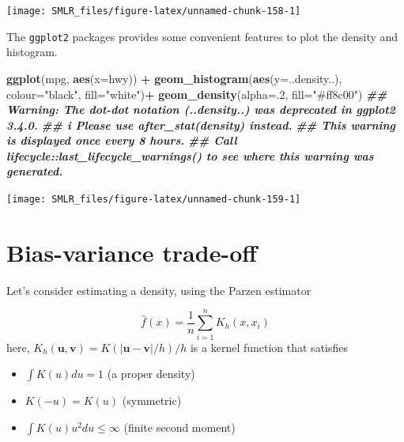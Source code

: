 \documentclass[
]{book}
\newenvironment{Shaded}{\begin{snugshade}}{\end{snugshade}}
\newcommand{\AttributeTok}[1]{\textcolor[rgb]{0.13,0.29,0.53}{#1}}
\newcommand{\DecValTok}[1]{\textcolor[rgb]{0.00,0.00,0.81}{#1}}
\newcommand{\DocumentationTok}[1]{\textcolor[rgb]{0.56,0.35,0.01}{\textbf{\textit{#1}}}}
\newcommand{\FunctionTok}[1]{\textcolor[rgb]{0.13,0.29,0.53}{\textbf{#1}}}
\newcommand{\NormalTok}[1]{#1}
\newcommand{\SpecialCharTok}[1]{\textcolor[rgb]{0.81,0.36,0.00}{\textbf{#1}}}
\newcommand{\StringTok}[1]{\textcolor[rgb]{0.31,0.60,0.02}{#1}}
\providecommand{\tightlist}{%
  \setlength{\itemsep}{0pt}\setlength{\parskip}{0pt}}
\theoremstyle{definition}
\theoremstyle{definition}
\theoremstyle{definition}
\theoremstyle{definition}
\theoremstyle{remark}
\begin{document}
\begin{center}\texttt{[image: SMLR\_files/figure-latex/unnamed-chunk-158-1]} \end{center}

The \texttt{ggplot2} packages provides some convenient features to plot the density and histogram.

\begin{Shaded}
\begin{Highlighting}[]
  \FunctionTok{ggplot}\NormalTok{(mpg, }\FunctionTok{aes}\NormalTok{(}\AttributeTok{x=}\NormalTok{hwy)) }\SpecialCharTok{+} 
    \FunctionTok{geom\_histogram}\NormalTok{(}\FunctionTok{aes}\NormalTok{(}\AttributeTok{y=}\NormalTok{..density..), }\AttributeTok{colour=}\StringTok{"black"}\NormalTok{, }\AttributeTok{fill=}\StringTok{"white"}\NormalTok{)}\SpecialCharTok{+}
    \FunctionTok{geom\_density}\NormalTok{(}\AttributeTok{alpha=}\NormalTok{.}\DecValTok{2}\NormalTok{, }\AttributeTok{fill=}\StringTok{"\#ff8c00"}\NormalTok{)}
\DocumentationTok{\#\# Warning: The dot{-}dot notation (\textasciigrave{}..density..\textasciigrave{}) was deprecated in ggplot2 3.4.0.}
\DocumentationTok{\#\# i Please use \textasciigrave{}after\_stat(density)\textasciigrave{} instead.}
\DocumentationTok{\#\# This warning is displayed once every 8 hours.}
\DocumentationTok{\#\# Call \textasciigrave{}lifecycle::last\_lifecycle\_warnings()\textasciigrave{} to see where this warning was generated.}
\end{Highlighting}
\end{Shaded}

\begin{center}\texttt{[image: SMLR\_files/figure-latex/unnamed-chunk-159-1]} \end{center}

\hypertarget{bias-variance-trade-off}{%
\section{Bias-variance trade-off}\label{bias-variance-trade-off}}

Let's consider estimating a density, using the Parzen estimator

\[\widehat f(x) = \frac{1}{n} \sum_{i=1}^n K_{h} (x, x_i)\]
here, \(K_h(\mathbf{u}, \mathbf{v}) = K(|\mathbf{u}- \mathbf{v}|/h)/h\) is a kernel function that satisfies

\begin{itemize}
\tightlist
\item
  \(\int K(u)du = 1\) (a proper density)
\item
  \(K(-u) = K(u)\) (symmetric)
\item
  \(\int K(u) u^2 du \leq \infty\) (finite second moment)
\end{itemize}
\end{document}
